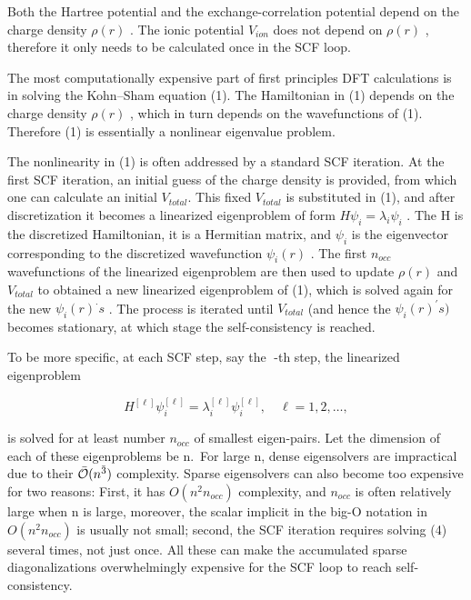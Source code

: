 \documentclass[
  10
]{article}
\begin{document}
Both the Hartree potential and the exchange-correlation potential depend
on the charge density \(\rho ( r )\) . The ionic potential
\(V _ { i o n }\) does not depend on \(\rho ( r )\) , therefore it only
needs to be calculated once in the SCF loop.

The most computationally expensive part of first principles DFT
calculations is in solving the Kohn--Sham equation (1). The Hamiltonian
in (1) depends on the charge density \(\rho ( r )\) , which in turn
depends on the wavefunctions of (1). Therefore (1) is essentially a
nonlinear eigenvalue problem.

The nonlinearity in (1) is often addressed by a standard SCF iteration.
At the first SCF iteration, an initial guess of the charge density is
provided, from which one can calculate an initial
\(V _ { t o t a l } .\) This fixed \(V _ { t o t a l }\) is substituted
in (1), and after discretization it becomes a linearized eigenproblem of
form \(H \psi _ { i } = \lambda _ { i } \psi _ { i }\) . The H is the
discretized Hamiltonian, it is a Hermitian matrix, and \(\psi _ { i }\)
is the eigenvector corresponding to the discretized wavefunction
\(\psi _ { i } ( r )\) . The first \(n _ { o c c }\) wavefunctions of
the linearized eigenproblem are then used to update \(\rho ( r )\) and
\(V _ { t o t a l }\) to obtained a new linearized eigenproblem of (1),
which is solved again for the new \(\psi _ { i } ( r ) ^ { \cdot } s\) .
The process is iterated until \(V _ { t o t a l }\) (and hence the
\(\psi _ { i } ( r ) ^ { \prime } s )\) becomes stationary, at which
stage the self-consistency is reached.

To be more specific, at each SCF step, say the -th step, the linearized
eigenproblem

\[
H ^ {[ \ell ]} \psi_ {i} ^ {[ \ell ]} = \lambda_ {i} ^ {[ \ell ]} \psi_ {i} ^ {[ \ell ]}, \quad \ell = 1, 2, \dots , \tag {4}
\]

is solved for at least number \(n _ { o c c }\) of smallest eigen-pairs.
Let the dimension of each of these eigenproblems be n.~For large n,
dense eigensolvers are impractical due to their
\({ \bar { \cal O } } ( n ^ { \bar { 3 } } )\) complexity. Sparse
eigensolvers can also become too expensive for two reasons: First, it
has \(O ( n ^ { 2 } n _ { o c c } )\) complexity, and \(n _ { o c c }\)
is often relatively large when n is large, moreover, the scalar implicit
in the big-O notation in \(O ( n ^ { 2 } n _ { o c c } )\) is usually
not small; second, the SCF iteration requires solving (4) several times,
not just once. All these can make the accumulated sparse
diagonalizations overwhelmingly expensive for the SCF loop to reach
self-consistency.
\end{document}
